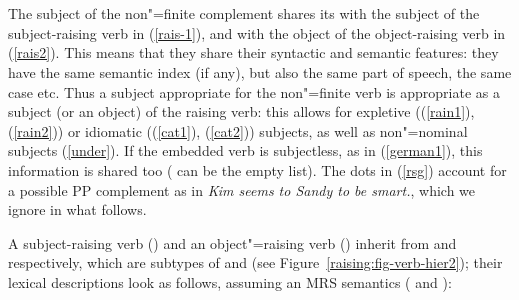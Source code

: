 \eal
\label{rsg}
\ex {} \impl\\
\avm{ [ \argst  \1, \ldots, < [subj & \1 ] >  ]} \label{rais-1}
\ex {}  \impl\\
\avm{ [ \argst  < NP > \+ \1 \+ < [subj & \1 ] > ]} \label{rais2}
\zl

\noindent
The subject of the non"=finite complement shares its 
with the subject of the subject-raising verb in (\ref{rais-1}), and with the object of the
object-raising verb in (\ref{rais2}). This means that they share their syntactic and semantic
features: they have the
same semantic index (if any), but also the same part of speech, the same case etc. Thus a subject appropriate for the
non"=finite verb is appropriate as a subject (or an object) of the raising verb: this allows for
expletive ((\ref{rain1}), (\ref{rain2})) or idiomatic ((\ref{cat1}), (\ref{cat2})) subjects, as well
as non"=nominal subjects (\ref{under}). If the embedded verb is subjectless, as in (\ref{german1}),
this information is shared too ( can be the empty list). The dots in (\ref{rsg}) account for
a possible PP complement as in \textit{Kim seems to Sandy to be smart.}, which we ignore in what
follows.

A subject-raising verb () and an object"=raising verb () inherit from
 and 
 respectively, which are subtypes of  and  (see Figure~\ref{raising:fig-verb-hier2}); their lexical descriptions look as follows,
assuming an MRS semantics (\citealp{CFPS2005a} and ):

